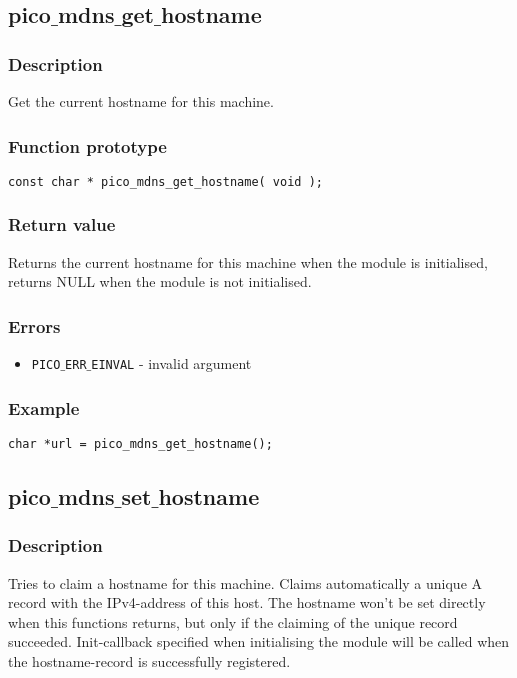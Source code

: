 \subsection{pico$\_$mdns$\_$get$\_$hostname}

\subsubsection*{Description}
Get the current hostname for this machine.

\subsubsection*{Function prototype}
\begin{verbatim}
const char * pico_mdns_get_hostname( void );
\end{verbatim}

\subsubsection*{Return value}
Returns the current hostname for this machine when the module is initialised, returns NULL when the module is not initialised.

\subsubsection*{Errors}
\begin{itemize}[noitemsep]
\item \texttt{PICO$\_$ERR$\_$EINVAL} - invalid argument
\end{itemize}

\subsubsection*{Example}
\begin{verbatim}
char *url = pico_mdns_get_hostname();
\end{verbatim}


\subsection{pico$\_$mdns$\_$set$\_$hostname}

\subsubsection*{Description}
Tries to claim a hostname for this machine. Claims automatically a unique A record with the IPv4-address of this host. The hostname won't be set directly when this functions returns, but only if the claiming of the unique record succeeded. Init-callback specified when initialising the module will be called when the hostname-record is successfully registered.

